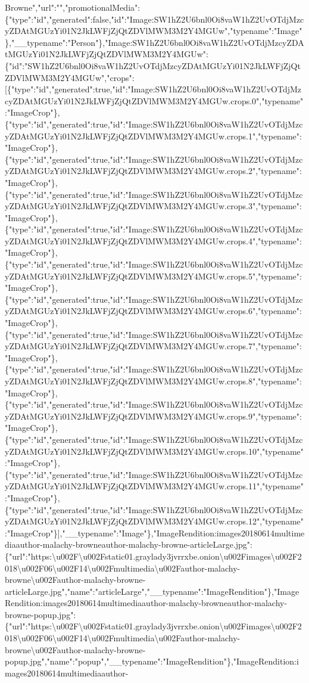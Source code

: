 Browne","url":"","promotionalMedia":\{"type":"id","generated":false,"id":"Image:SW1hZ2U6bnl0Oi8vaW1hZ2UvOTdjMzcyZDAtMGUzYi01N2JkLWFjZjQtZDVlMWM3M2Y4MGUw","typename":"Image"\},"\_\_typename":"Person"\},"Image:SW1hZ2U6bnl0Oi8vaW1hZ2UvOTdjMzcyZDAtMGUzYi01N2JkLWFjZjQtZDVlMWM3M2Y4MGUw":\{"id":"SW1hZ2U6bnl0Oi8vaW1hZ2UvOTdjMzcyZDAtMGUzYi01N2JkLWFjZjQtZDVlMWM3M2Y4MGUw","crops":{[}\{"type":"id","generated":true,"id":"Image:SW1hZ2U6bnl0Oi8vaW1hZ2UvOTdjMzcyZDAtMGUzYi01N2JkLWFjZjQtZDVlMWM3M2Y4MGUw.crops.0","typename":"ImageCrop"\},\{"type":"id","generated":true,"id":"Image:SW1hZ2U6bnl0Oi8vaW1hZ2UvOTdjMzcyZDAtMGUzYi01N2JkLWFjZjQtZDVlMWM3M2Y4MGUw.crops.1","typename":"ImageCrop"\},\{"type":"id","generated":true,"id":"Image:SW1hZ2U6bnl0Oi8vaW1hZ2UvOTdjMzcyZDAtMGUzYi01N2JkLWFjZjQtZDVlMWM3M2Y4MGUw.crops.2","typename":"ImageCrop"\},\{"type":"id","generated":true,"id":"Image:SW1hZ2U6bnl0Oi8vaW1hZ2UvOTdjMzcyZDAtMGUzYi01N2JkLWFjZjQtZDVlMWM3M2Y4MGUw.crops.3","typename":"ImageCrop"\},\{"type":"id","generated":true,"id":"Image:SW1hZ2U6bnl0Oi8vaW1hZ2UvOTdjMzcyZDAtMGUzYi01N2JkLWFjZjQtZDVlMWM3M2Y4MGUw.crops.4","typename":"ImageCrop"\},\{"type":"id","generated":true,"id":"Image:SW1hZ2U6bnl0Oi8vaW1hZ2UvOTdjMzcyZDAtMGUzYi01N2JkLWFjZjQtZDVlMWM3M2Y4MGUw.crops.5","typename":"ImageCrop"\},\{"type":"id","generated":true,"id":"Image:SW1hZ2U6bnl0Oi8vaW1hZ2UvOTdjMzcyZDAtMGUzYi01N2JkLWFjZjQtZDVlMWM3M2Y4MGUw.crops.6","typename":"ImageCrop"\},\{"type":"id","generated":true,"id":"Image:SW1hZ2U6bnl0Oi8vaW1hZ2UvOTdjMzcyZDAtMGUzYi01N2JkLWFjZjQtZDVlMWM3M2Y4MGUw.crops.7","typename":"ImageCrop"\},\{"type":"id","generated":true,"id":"Image:SW1hZ2U6bnl0Oi8vaW1hZ2UvOTdjMzcyZDAtMGUzYi01N2JkLWFjZjQtZDVlMWM3M2Y4MGUw.crops.8","typename":"ImageCrop"\},\{"type":"id","generated":true,"id":"Image:SW1hZ2U6bnl0Oi8vaW1hZ2UvOTdjMzcyZDAtMGUzYi01N2JkLWFjZjQtZDVlMWM3M2Y4MGUw.crops.9","typename":"ImageCrop"\},\{"type":"id","generated":true,"id":"Image:SW1hZ2U6bnl0Oi8vaW1hZ2UvOTdjMzcyZDAtMGUzYi01N2JkLWFjZjQtZDVlMWM3M2Y4MGUw.crops.10","typename":"ImageCrop"\},\{"type":"id","generated":true,"id":"Image:SW1hZ2U6bnl0Oi8vaW1hZ2UvOTdjMzcyZDAtMGUzYi01N2JkLWFjZjQtZDVlMWM3M2Y4MGUw.crops.11","typename":"ImageCrop"\},\{"type":"id","generated":true,"id":"Image:SW1hZ2U6bnl0Oi8vaW1hZ2UvOTdjMzcyZDAtMGUzYi01N2JkLWFjZjQtZDVlMWM3M2Y4MGUw.crops.12","typename":"ImageCrop"\}{]},"\_\_typename":"Image"\},"ImageRendition:images20180614multimediaauthor-malachy-browneauthor-malachy-browne-articleLarge.jpg":\{"url":"https:\textbackslash{}u002F\textbackslash{}u002Fstatic01.graylady3jvrrxbe.onion\textbackslash{}u002Fimages\textbackslash{}u002F2018\textbackslash{}u002F06\textbackslash{}u002F14\textbackslash{}u002Fmultimedia\textbackslash{}u002Fauthor-malachy-browne\textbackslash{}u002Fauthor-malachy-browne-articleLarge.jpg","name":"articleLarge","\_\_typename":"ImageRendition"\},"ImageRendition:images20180614multimediaauthor-malachy-browneauthor-malachy-browne-popup.jpg":\{"url":"https:\textbackslash{}u002F\textbackslash{}u002Fstatic01.graylady3jvrrxbe.onion\textbackslash{}u002Fimages\textbackslash{}u002F2018\textbackslash{}u002F06\textbackslash{}u002F14\textbackslash{}u002Fmultimedia\textbackslash{}u002Fauthor-malachy-browne\textbackslash{}u002Fauthor-malachy-browne-popup.jpg","name":"popup","\_\_typename":"ImageRendition"\},"ImageRendition:images20180614multimediaauthor-